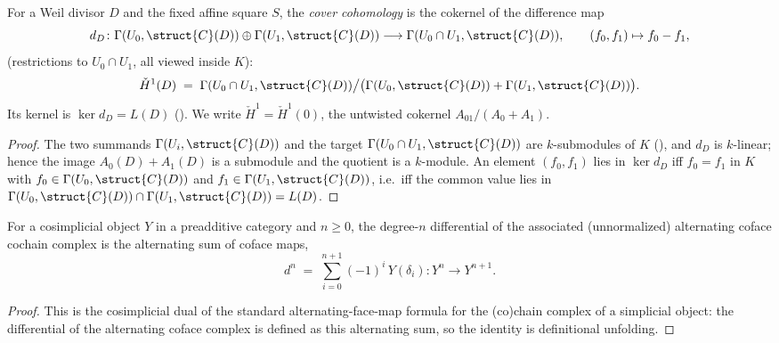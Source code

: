 \begin{definition}
  \label{def:adelic_coverH1}
  For a Weil divisor \(D\) and the fixed affine square \(S\), the
  \emph{cover cohomology} is the cokernel of the difference map
  \[
    d_D \colon
      \Gamma(U_0, \struct{C}(D)) \oplus \Gamma(U_1, \struct{C}(D))
      \longrightarrow \Gamma(U_0 \cap U_1, \struct{C}(D)),
    \qquad (f_0, f_1) \mapsto f_0 - f_1,
  \]
  (restrictions to \(U_0 \cap U_1\), all viewed inside \(K\)):
  \[
    \check{H}^1(D) \;=\;
      \Gamma(U_0 \cap U_1, \struct{C}(D)) \big/
      \bigl(\Gamma(U_0, \struct{C}(D)) + \Gamma(U_1, \struct{C}(D))\bigr).
  \]
  Its kernel is \(\ker d_D = L(D)\) ().
  We write \(\check{H}^1 = \check{H}^1(0)\), the untwisted cokernel
  \(A_{01}/(A_0 + A_1)\).
\end{definition}
\begin{proof}
  The two summands \(\Gamma(U_i, \struct{C}(D))\) and the target
  \(\Gamma(U_0 \cap U_1, \struct{C}(D))\) are \(k\)-submodules of \(K\)
  (), and \(d_D\) is \(k\)-linear;
  hence the image \(A_0(D) + A_1(D)\) is a submodule and the quotient is
  a \(k\)-module. An element \((f_0, f_1)\) lies in \(\ker d_D\) iff
  \(f_0 = f_1\) in \(K\) with \(f_0 \in \Gamma(U_0, \struct{C}(D))\) and
  \(f_1 \in \Gamma(U_1, \struct{C}(D))\), i.e.\ iff the common value lies
  in \(\Gamma(U_0, \struct{C}(D)) \cap \Gamma(U_1, \struct{C}(D)) =
  L(D)\).
\end{proof}

\begin{lemma}
  \label{lem:adelic_alternatingCofaceMapComplex_objD}
  \leanok
  For a cosimplicial object \(Y\) in a preadditive category and \(n \ge
  0\), the degree-\(n\) differential of the associated (unnormalized)
  alternating coface cochain complex is the alternating sum of coface
  maps,
  \[
    d^n \;=\; \sum_{i = 0}^{n+1} (-1)^i\, Y(\delta_i) \colon Y^n \to
    Y^{n+1}.
  \]
\end{lemma}
\begin{proof}
  \leanok
  This is the cosimplicial dual of the standard alternating-face-map
  formula for the (co)chain complex of a simplicial object: the
  differential of the alternating coface complex is defined as this
  alternating sum, so the identity is definitional unfolding.
\end{proof}

